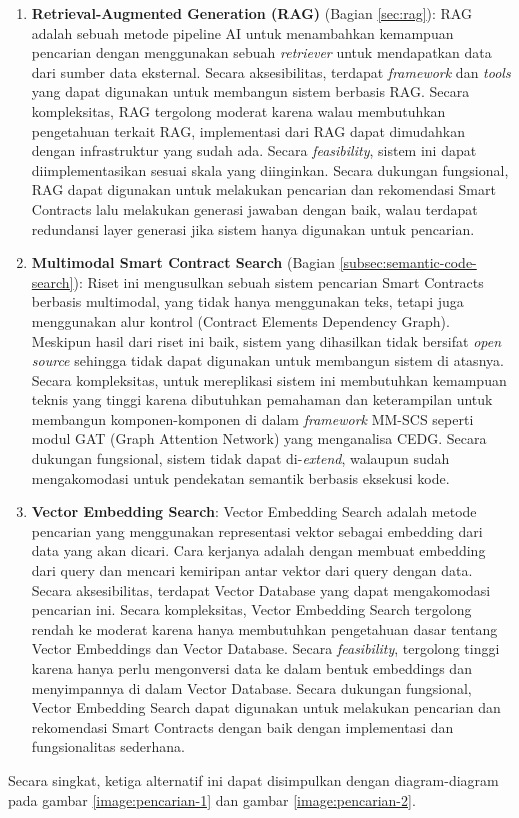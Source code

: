 \begin{enumerate}
	\item \textbf{Retrieval-Augmented Generation (RAG)} (Bagian \ref{sec:rag}): RAG adalah sebuah metode pipeline AI untuk menambahkan kemampuan pencarian dengan menggunakan sebuah \textit{retriever} untuk mendapatkan data dari sumber data eksternal. Secara aksesibilitas, terdapat \textit{framework} dan \textit{tools} yang dapat digunakan untuk membangun sistem berbasis RAG. Secara kompleksitas, RAG tergolong moderat karena walau membutuhkan pengetahuan terkait RAG, implementasi dari RAG dapat dimudahkan dengan infrastruktur yang sudah ada. Secara \textit{feasibility}, sistem ini dapat diimplementasikan sesuai skala yang diinginkan. Secara dukungan fungsional, RAG dapat digunakan untuk melakukan pencarian dan rekomendasi Smart Contracts lalu melakukan generasi jawaban dengan baik, walau terdapat redundansi layer generasi jika sistem hanya digunakan untuk pencarian.

	\item \textbf{Multimodal Smart Contract Search} \parencite{shi2021semantic} (Bagian \ref{subsec:semantic-code-search}): Riset ini mengusulkan sebuah sistem pencarian Smart Contracts berbasis multimodal, yang tidak hanya menggunakan teks, tetapi juga menggunakan alur kontrol (Contract Elements Dependency Graph). Meskipun hasil dari riset ini baik, sistem yang dihasilkan tidak bersifat \textit{open source} sehingga tidak dapat digunakan untuk membangun sistem di atasnya. Secara kompleksitas, untuk mereplikasi sistem ini membutuhkan kemampuan teknis yang tinggi karena dibutuhkan pemahaman dan keterampilan untuk membangun komponen-komponen di dalam \textit{framework} MM-SCS seperti modul GAT (Graph Attention Network) yang menganalisa CEDG. Secara dukungan fungsional, sistem tidak dapat di-\textit{extend}, walaupun sudah mengakomodasi untuk pendekatan semantik berbasis eksekusi kode.

	\item \textbf{Vector Embedding Search}: Vector Embedding Search adalah metode pencarian yang menggunakan representasi vektor sebagai embedding dari data yang akan dicari. Cara kerjanya adalah dengan membuat embedding dari query dan mencari kemiripan antar vektor dari query dengan data. Secara aksesibilitas, terdapat Vector Database yang dapat mengakomodasi pencarian ini. Secara kompleksitas, Vector Embedding Search tergolong rendah ke moderat karena hanya membutuhkan pengetahuan dasar tentang Vector Embeddings dan Vector Database. Secara \textit{feasibility}, tergolong tinggi karena hanya perlu mengonversi data ke dalam bentuk embeddings dan menyimpannya di dalam Vector Database. Secara dukungan fungsional, Vector Embedding Search dapat digunakan untuk melakukan pencarian dan rekomendasi Smart Contracts dengan baik dengan implementasi dan fungsionalitas sederhana.
\end{enumerate}

Secara singkat, ketiga alternatif ini dapat disimpulkan dengan diagram-diagram pada gambar \ref{image:pencarian-1} dan gambar \ref{image:pencarian-2}.